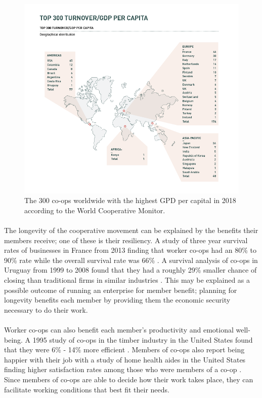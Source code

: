 \begin{figure}[h!]
    \centering
    \includegraphics[width=\linewidth]{Figures/GlobalCoopsGDP.png}
    \caption{The 300 co-ops worldwide with the highest GPD per capital in 2018 according to the World Cooperative Monitor.}
\end{figure}

\paragraph{} The longevity of the cooperative movement can be explained by the benefits their members receive; one of these is their resiliency. A study of three year survival rates of businesses in France from 2013 finding that worker co-ops had an 80\% to 90\% rate while the overall survival rate was 66\% \autocite{kruse_relative_2013}. A survival analysis of co-ops in Uruguay from 1999 to 2008 found that they had a roughly 29\% smaller chance of closing than traditional firms in similar industries \autocite{burdin_are_2014}. This may be explained as a possible outcome of running an enterprise for member benefit; planning for longevity benefits each member by providing them the economic security necessary to do their work.

\paragraph{} Worker co-ops can also benefit each member's productivity and emotional well-being. A 1995 study of co-ops in the timber industry in the United States found that they were 6\% - 14\% more efficient \autocite{craig_participation_1995}. Members of co-ops also report being happier with their job with a study of home health aides in the United States finding higher satisfaction rates among those who were members of a co-op \autocite{kruse_effects_2013}. Since members of co-ops are able to decide how their work takes place, they can facilitate working conditions that best fit their needs.

